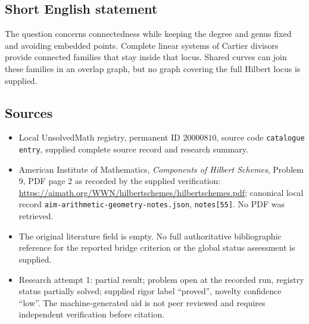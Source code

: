 \documentclass[11pt]{article}
\begin{document}
\subsection{Short English statement}
The question concerns connectedness while keeping the degree and genus fixed and avoiding embedded points. Complete linear systems of Cartier divisors provide connected families that stay inside that locus. Shared curves can join these families in an overlap graph, but no graph covering the full Hilbert locus is supplied.
\subsection{Sources}
\begin{itemize}
\item Local UnsolvedMath registry, permanent ID $20000810$, source code \texttt{catalogue entry}, supplied complete source record and research summary.
\item American Institute of Mathematics, \emph{Components of Hilbert Schemes}, Problem 9, PDF page 2 as recorded by the supplied verification: \url{https://aimath.org/WWN/hilbertschemes/hilbertschemes.pdf}; canonical local record \texttt{aim-arithmetic-geometry-notes.json}, \texttt{notes[55]}. No PDF was retrieved.
\item The original literature field is empty. No full authoritative bibliographic reference for the reported bridge criterion or the global status assessment is supplied.
\item Research attempt 1: partial result; problem open at the recorded run, registry status partially solved; supplied rigor label ``proved'', novelty confidence ``low''. The machine-generated aid is not peer reviewed and requires independent verification before citation.
\end{itemize}
\end{document}
